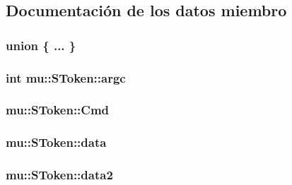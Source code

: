 \subsection{Documentación de los datos miembro}
\subsubsection[{\texorpdfstring{"@1}{@1}}]{\setlength{\rightskip}{0pt plus 5cm}union \{ ... \} }\hypertarget{structmu_1_1_s_token_a34231de7580ebb30fa11f93bef135ea8}{}\label{structmu_1_1_s_token_a34231de7580ebb30fa11f93bef135ea8}
\subsubsection[{\texorpdfstring{argc}{argc}}]{\setlength{\rightskip}{0pt plus 5cm}int mu\+::\+S\+Token\+::argc}\hypertarget{structmu_1_1_s_token_a88e90c6610efb6d7b7a7a8c3461bbc00}{}\label{structmu_1_1_s_token_a88e90c6610efb6d7b7a7a8c3461bbc00}
\subsubsection[{\texorpdfstring{Cmd}{Cmd}}]{ mu\+::\+S\+Token\+::\+Cmd}\hypertarget{structmu_1_1_s_token_ae65874515716fe53e71fcae813b8fc5f}{}\label{structmu_1_1_s_token_ae65874515716fe53e71fcae813b8fc5f}
\subsubsection[{\texorpdfstring{data}{data}}]{ mu\+::\+S\+Token\+::data}\hypertarget{structmu_1_1_s_token_ac8a30600d0f3721e676d2fe706f4520b}{}\label{structmu_1_1_s_token_ac8a30600d0f3721e676d2fe706f4520b}
\subsubsection[{\texorpdfstring{data2}{data2}}]{ mu\+::\+S\+Token\+::data2}\hypertarget{structmu_1_1_s_token_aac6f7c4c29647a815a3ecdcf66f5ac06}{}\label{structmu_1_1_s_token_aac6f7c4c29647a815a3ecdcf66f5ac06}
